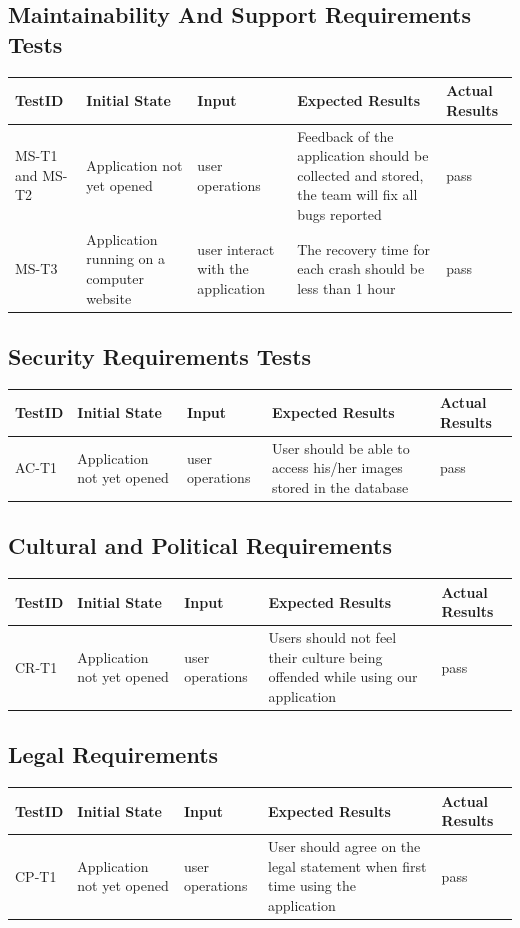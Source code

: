 \documentclass[12pt, titlepage]{article}
\begin{document}
\subsection{Maintainability And Support Requirements Tests}
\begin{tabular}{ |p{2cm}| p{3cm} |p{4cm}| p{4cm}|p{2cm}|  }
\hline
 TestID & Initial State & Input & Expected Results & Actual Results\\ 
 \hline
 MS-T1 and MS-T2 & Application not yet opened & user operations & Feedback of the application should be collected and stored, the team will fix all bugs reported & pass\\
 \hline
 MS-T3 & Application running on a computer website & user interact with the application & The recovery time for each crash should be less than 1 hour  & pass\\
 \hline
\end{tabular}
\subsection{Security Requirements Tests}
\begin{tabular}{ |p{2cm}| p{3cm} |p{4cm}| p{4cm}|p{2cm}|  }
\hline
 TestID & Initial State & Input & Expected Results & Actual Results\\ 
 \hline
 AC-T1 & Application not yet opened & user operations & User should be able to access his/her images stored in the database & pass\\
 \hline
\end{tabular}
\subsection{Cultural and Political Requirements}
\begin{tabular}{ |p{2cm}| p{3cm} |p{4cm}| p{4cm}|p{2cm}|  }
\hline
 TestID & Initial State & Input & Expected Results & Actual Results\\ 
 \hline
 CR-T1 & Application not yet opened & user operations & Users should not feel their culture being offended while using our application & pass\\
 \hline
\end{tabular}
\subsection{Legal Requirements}
\begin{tabular}{ |p{2cm}| p{3cm} |p{4cm}| p{4cm}|p{2cm}|  }
\hline
 TestID & Initial State & Input & Expected Results & Actual Results\\ 
 \hline
 CP-T1 & Application not yet opened & user operations & User should agree on the legal statement when first time using the application & pass\\
 \hline
\end{tabular}
\end{document}
